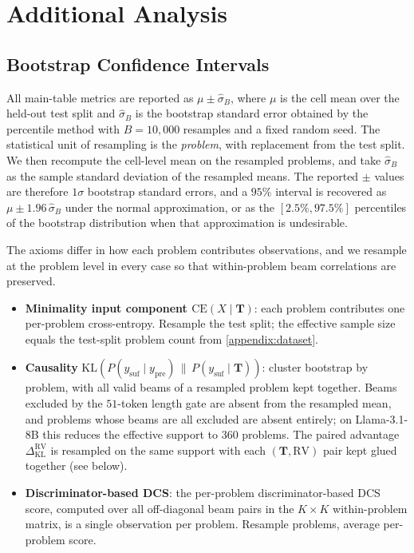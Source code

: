 \section{Additional Analysis}
\label{appendix:additional_analysis}

\subsection{Bootstrap Confidence Intervals}
\label{appendix:sub:bootstrap}

All main-table metrics are reported as $\mu \pm \widehat{\sigma}_B$, where
$\mu$ is the cell mean over the held-out test split and $\widehat{\sigma}_B$
is the bootstrap standard error obtained by the percentile method with
$B = 10{,}000$ resamples and a fixed random seed. The statistical
unit of resampling is the \emph{problem}, with replacement from the test split. We then recompute
the cell-level mean on the resampled problems, and take
$\widehat{\sigma}_B$ as the sample standard deviation of the resampled
means. The reported $\pm$ values are therefore $1\sigma$ bootstrap standard
errors, and a $95\%$ interval is recovered as $\mu \pm 1.96\,\widehat{\sigma}_B$
under the normal approximation, or as the $[2.5\%, 97.5\%]$ percentiles of
the bootstrap distribution when that approximation is undesirable.

The axioms differ in how each problem contributes observations, and we
resample at the problem level in every case so that within-problem
beam correlations are preserved.
\begin{itemize}[nosep,leftmargin=1.5em]
  \item \textbf{Minimality input component
        $\text{CE}(X \mid \mathbf{T})$}:
        each problem contributes one per-problem cross-entropy.
        Resample the test split; the effective sample size equals the
        test-split problem count from \cref{appendix:dataset}.
  \item \textbf{Causality} $\mathrm{KL}\!\left(P(y_{\mathrm{suf}} \mid y_{\mathrm{pre}}) \,\|\, P(y_{\mathrm{suf}} \mid \mathbf{T})\right)$:
        cluster bootstrap by problem, with all valid beams of a resampled
        problem kept together. Beams excluded by the $51$-token length
        gate are absent from the resampled mean, and problems whose
        beams are all excluded are absent entirely; on Llama-3.1-8B
        this reduces the effective support to $360$ problems. The paired
        advantage $\Delta^{\mathrm{RV}}_{\mathrm{KL}}$ is resampled on
        the same support with each $(\mathbf{T}, \mathrm{RV})$ pair kept
        glued together (see below).
  \item \textbf{Discriminator-based DCS}: the per-problem
        discriminator-based DCS score, computed over all
        off-diagonal beam pairs in the $K \times K$ within-problem matrix,
        is a single observation per problem. Resample problems, average
        per-problem score.
\end{itemize}

